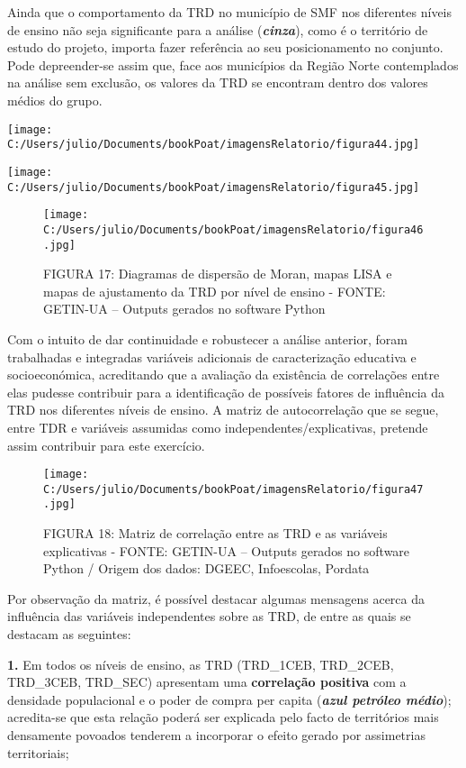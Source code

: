 \documentclass[
]{book}
\begin{document}
Ainda que o comportamento da TRD no município de SMF nos diferentes níveis de ensino não seja significante para a análise (\textbf{\emph{cinza}}), como é o território de estudo do projeto, importa fazer referência ao seu posicionamento no conjunto. Pode depreender-se assim que, face aos municípios da Região Norte contemplados na análise sem exclusão, os valores da TRD se encontram dentro dos valores médios do grupo.

\texttt{[image: C:/Users/julio/Documents/bookPoat/imagensRelatorio/figura44.jpg]}

\texttt{[image: C:/Users/julio/Documents/bookPoat/imagensRelatorio/figura45.jpg]}

\begin{figure}
\centering
\texttt{[image: C:/Users/julio/Documents/bookPoat/imagensRelatorio/figura46.jpg]}
\caption{FIGURA 17: Diagramas de dispersão de Moran, mapas LISA e mapas de ajustamento da TRD por nível de ensino - FONTE: GETIN-UA -- Outputs gerados no software Python}
\end{figure}

Com o intuito de dar continuidade e robustecer a análise anterior, foram trabalhadas e integradas variáveis adicionais de caracterização educativa e socioeconómica, acreditando que a avaliação da existência de correlações entre elas pudesse contribuir para a identificação de possíveis fatores de influência da TRD nos diferentes níveis de ensino. A matriz de autocorrelação que se segue, entre TDR e variáveis assumidas como independentes/explicativas, pretende assim contribuir para este exercício.

\begin{figure}
\centering
\texttt{[image: C:/Users/julio/Documents/bookPoat/imagensRelatorio/figura47.jpg]}
\caption{FIGURA 18: Matriz de correlação entre as TRD e as variáveis explicativas - FONTE: GETIN-UA -- Outputs gerados no software Python / Origem dos dados: DGEEC, Infoescolas, Pordata}
\end{figure}

Por observação da matriz, é possível destacar algumas mensagens acerca da influência das variáveis independentes sobre as TRD, de entre as quais se destacam as seguintes:

\textbf{1.} Em todos os níveis de ensino, as TRD (TRD\_1CEB, TRD\_2CEB, TRD\_3CEB, TRD\_SEC) apresentam uma \textbf{correlação positiva} com a densidade populacional e o poder de compra per capita (\textbf{\emph{azul petróleo médio}}); acredita-se que esta relação poderá ser explicada pelo facto de territórios mais densamente povoados tenderem a incorporar o efeito gerado por assimetrias territoriais;
\end{document}
